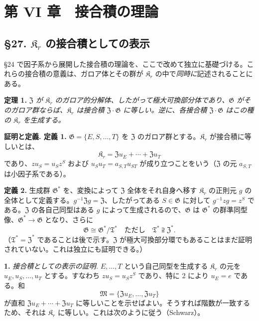 \section*{第 VI 章　接合積の理論}\label{kapitel-vi.-theorie-der-verschraenkten-produkte}

\subsection*{\S 27. \(\mathfrak K_r\) の接合積としての表示}

\S 24 で因子系から展開した接合積の理論を、ここで改めて独立に基礎づける。これらの接合積の意義は、ガロア体とその群が \(\mathfrak K_r\) の中で\emph{同時に}記述されることにある。

\noindent\textbf{定理 1.} \emph{\(\mathfrak Z\) が \(\mathfrak K_r\) のガロア的分解体、したがって極大可換部分体であり、\(\mathfrak G\) がそのガロア群ならば、\(\mathfrak K_r\) は接合積 \(\mathfrak Z\cdot\mathfrak G\) に等しい。逆に、各接合積 \(\mathfrak Z\cdot\mathfrak G\) はこの種の \(\mathfrak K_r\) を生成する。}

\noindent\textbf{証明と定義. 定義 1.} \(\mathfrak G=\{E,S,\ldots,T\}\) を \(\mathfrak Z\) のガロア群とする。\(\mathfrak K_r\) が接合積に等しいとは、
\[
\mathfrak K_r=\mathfrak Zu_E+\cdots+\mathfrak Zu_T
\]
であり、\(zu_S=u_Sz^S\) および \(u_Su_T=a_{S,T}u_{ST}\) が成り立つことをいう（\(\mathfrak Z\) の元 \(a_{S,T}\) は小因子系である）。

\noindent\textbf{定義 2.} 生成群 \(\mathfrak G^*\) を、変換によって \(\mathfrak Z\) 全体をそれ自身へ移す \(\mathfrak K_r\) の正則元 \(g\) の全体として定義する。\(g^{-1}\mathfrak Zg=\mathfrak Z\)、したがってある \(S\in\mathfrak G\) に対して \(g^{-1}zg=z^S\) である。\(\mathfrak Z\) の各自己同型はある \(g\) によって生成されるので、\(\mathfrak G\) は \(\mathfrak G^*\) の群準同型像、\(\mathfrak G^*\to\mathfrak G\) となり、さらに
\[
\mathfrak G\cong\mathfrak G^*/\mathfrak T^*
\quad\text{ただし}\quad
\mathfrak T^*\supseteqq\mathfrak Z^*.
\]
（\(\mathfrak T^*=\mathfrak Z^*\) であることは後で示す。\(\mathfrak Z\) が極大可換部分環でもあることはまだ証明されていない。これは独立にも証明できる。）

\noindent\textbf{1.} \emph{接合積としての表示の証明.} \(E,\ldots,T\) という自己同型を生成する \(\mathfrak K_r\) の元を \(u_E,u_S,\ldots,u_T\) とする。すなわち \(zu_S=u_Sz^S\) であり、特に 2 により \(u_E=e\) である。和
\[
\mathfrak M=\{\mathfrak Zu_E,\ldots,\mathfrak Zu_T\}
\]
が直和 \(\mathfrak Zu_E+\cdots+\mathfrak Zu_T\) に等しいことを示せばよい。そうすれば階数が一致するため、それは \(\mathfrak K_r\) に等しい。これは次のように従う（Schwarz）。

